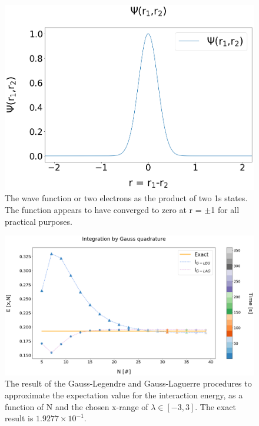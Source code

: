 \documentclass[%
reprint,
amsmath,amssymb,
aps,
]{revtex4-1}
\begin{document}
\newpage 
\begin{figure}[!ht]
	\includegraphics[scale = 0.24]{Wavefunction.png}
	\caption{\label{wavefigure} The wave function or two electrons as the product of two 1s states. The function appears to have converged to zero at r = $\pm$1 for all practical purposes.}
\end{figure}
\vspace{20mm}
\onecolumngrid

\begin{figure}[hb!]
	\includegraphics[width=\textwidth]{Gauss_lagleg_2.png}
	\caption{\label{integrated_results} The result of the Gauss-Legendre and Gauss-Laguerre procedures to approximate the expectation value for the interaction energy, as a function of N and the chosen x-range of $\lambda \in[-3,3]$. The exact result is $1.9277\times 10^{-1}$. }
\end{figure}
\end{document}
